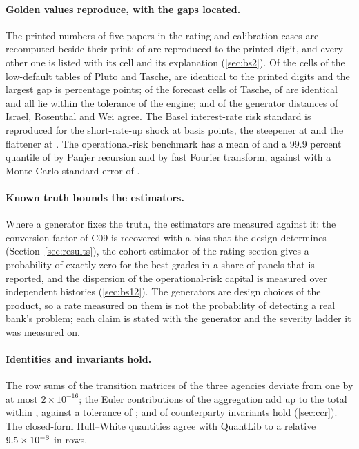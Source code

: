\paragraph{Golden values reproduce, with the gaps located.} The printed numbers of five papers in the rating and calibration cases are recomputed beside their print: \pxTwoReproduced{} of \pxTwoPrinted{} are reproduced to the printed digit, and every other one is listed with its cell and its explanation (\cref{sec:bs2}). Of the \rtgPtCells{} cells of the low-default tables of Pluto and Tasche, \rtgPtIdent{} are identical to the printed digits and the largest gap is \rtgPtMaxgap{} percentage points; of the forecast cells of Tasche, \rtgGoldSevenIdent{} of \rtgGoldSevenN{} are identical and all lie within the tolerance of the engine; and \rtgIrwAgree{} of the \rtgIrwTotal{} generator distances of Israel, Rosenthal and Wei agree. The Basel interest-rate risk standard is reproduced for the short-rate-up shock at \almSrpShortUp{} basis points, the steepener at \almSrpSteepener{} and the flattener at \almSrpFlattener{}. The operational-risk benchmark has a mean of \opBenchMean{} and a 99.9 percent quantile of \opBenchPanjer{} by Panjer recursion and \opBenchFft{} by fast Fourier transform, against \opBenchMcQ{} with a Monte Carlo standard error of \opBenchMcSe{}.

\paragraph{Known truth bounds the estimators.} Where a generator fixes the truth, the estimators are measured against it: the conversion factor of C09 is recovered with a bias that the design determines (Section~\ref{sec:results}), the cohort estimator of the rating section gives a probability of exactly zero for the best grades in a share of panels that is reported, and the dispersion of the operational-risk capital is measured over \pxTwelveHistories{} independent histories (\cref{sec:bs12}). The generators are design choices of the product, so a rate measured on them is not the probability of detecting a real bank's problem; each claim is stated with the generator and the severity ladder it was measured on.

\paragraph{Identities and invariants hold.} The row sums of the transition matrices of the three agencies deviate from one by at most $2\times10^{-16}$; the Euler contributions of the aggregation add up to the total within \agstEulerErr{}, against a tolerance of \agstEulerTol{}; and \ccrInvariantHold{} of \ccrInvariantRows{} counterparty invariants hold (\cref{sec:ccr}). The closed-form Hull--White quantities agree with QuantLib to a relative $9.5\times10^{-8}{}$ in \ccrQlRows{} rows.

